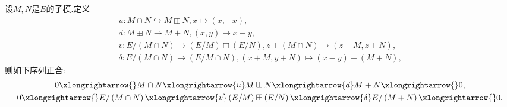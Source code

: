 \begin{proposition}{}{}
	设$M,N$是$E$的子模.定义
	\begin{gather*}
		u:M\cap N\hookrightarrow M\boxplus N,x\mapsto\left(x,-x\right),\\
		d:M\boxplus N\to M+N,\left(x,y\right)\mapsto x-y,\\
		v:E/\left(M\cap N\right)\to\left(E/M\right)\boxplus\left(E/N\right),z+\left(M\cap N\right)\mapsto\left(z+M,z+N\right),\\
		\delta:E/\left(M\cap N\right)\to\left(E/M\cap N\right),\left(x+M,y+N\right)\mapsto\left(x-y\right)+\left(M+N\right),
	\end{gather*}
	则如下序列正合:
	\begin{gather*}
		0\xlongrightarrow{}M\cap N\xlongrightarrow{u}M\boxplus N\xlongrightarrow{d}M+N\xlongrightarrow{}0,\\
		0\xlongrightarrow{}E/\left(M\cap N\right)\xlongrightarrow{v}\left(E/M\right)\boxplus\left(E/N\right)\xlongrightarrow{\delta}E/\left(M+N\right)\xlongrightarrow{}0.
	\end{gather*}
\end{proposition}

